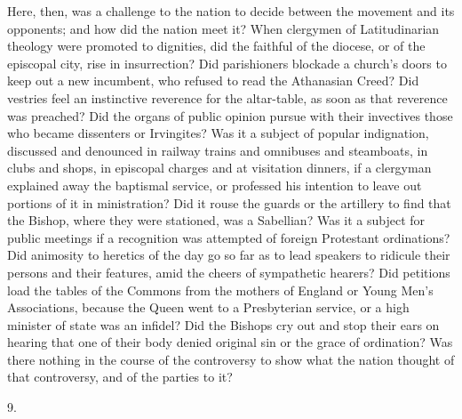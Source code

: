 Here, then, was a challenge to the nation to decide between the
movement and its opponents; and how did the nation meet it? When
clergymen of Latitudinarian theology were promoted to dignities, did
the faithful of the diocese, or of the episcopal city, rise in
insurrection? Did parishioners blockade a church's doors to keep out a
new incumbent, who refused to read the Athanasian Creed? Did vestries
feel an instinctive reverence for the altar-table, as soon as that
reverence was preached? Did the organs of public opinion pursue with
their invectives those who became dissenters or Irvingites? Was it a
subject of popular indignation, discussed and denounced in railway
trains and omnibuses and steamboats, in clubs and shops, in episcopal
charges and at visitation dinners, if a clergyman explained away the
baptismal service, or professed his intention to leave out portions of
it in ministration? Did it rouse the guards or the artillery to find
that the Bishop, where they were stationed, was a Sabellian? Was it a
subject for public meetings if a recognition was attempted of foreign
Protestant ordinations? Did animosity to heretics of the day go so far
as to lead speakers to ridicule their persons and their features, amid
the cheers of sympathetic hearers? Did petitions load the tables of
the Commons from the mothers of England or Young Men's Associations,
because the Queen went to a Presbyterian service, or a high minister
of state was an infidel? Did the Bishops cry out and stop their ears
on hearing that one of their body denied original sin or the grace of
ordination? Was there nothing in the course of the controversy to show
what the nation thought of that controversy, and of the parties to it?

9.

